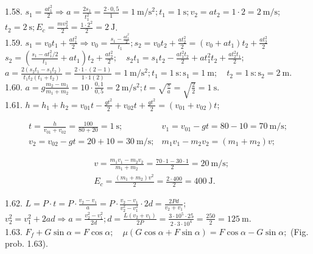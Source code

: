\documentclass[10pt]{article}
\begin{document}
1.58. $s_{1}=\frac{a t_{1}^{2}}{2} \Rightarrow a=\frac{2 s_{1}}{t_{1}^{2}}=\frac{2 \cdot 0,5}{1}=1 \mathrm{~m} / \mathrm{s}^{2} ; t_{1}=1 \mathrm{~s} ; v_{2}=a t_{2}=1 \cdot 2=2 \mathrm{~m} / \mathrm{s}$; $t_{2}=2 \mathrm{~s} ; E_{c}=\frac{m v_{2}^{2}}{2}=\frac{1 \cdot 2^{2}}{2}=2 \mathrm{~J}$.\\
1.59. $s_{1}=v_{0} t_{1}+\frac{a t_{1}^{2}}{2} \Rightarrow v_{0}=\frac{s_{1}-\frac{a t_{1}^{2}}{2}}{t_{1}} ; s_{2}=v_{0} t_{2}+\frac{a t_{2}^{2}}{2}=\left(v_{0}+a t_{1}\right) t_{2}+\frac{a t_{2}^{2}}{2}$ $s_{2}=\left(\frac{s_{1}-a t_{1}^{2} / 2}{t_{1}}+a t_{1}\right) t_{2}+\frac{a t_{2}^{2}}{2} ; \quad s_{2} t_{1}=s_{1} t_{2}-\frac{a t_{1}^{2} t_{2}}{2}+a t_{1}^{2} t_{2}+\frac{a t_{2}^{2} t_{1}}{2} ;$\\
$a=\frac{2\left(s_{2} t_{1}-s_{1} t_{2}\right)}{t_{1} t_{2}\left(t_{1}+t_{2}\right)}=\frac{2 \cdot 1 \cdot(2-1)}{1 \cdot 1(2)}=1 \mathrm{~m} / \mathrm{s}^{2} ; t_{1}=1 \mathrm{~s}: \mathrm{s}_{1}=1 \mathrm{~m} ; \quad t_{2}=1 \mathrm{~s}: \mathrm{s}_{2}=2 \mathrm{~m}$.\\
1.60. $a=g \frac{m_{2}-m_{1}}{m_{1}+m_{2}}=10 \cdot \frac{0,1}{0,5}=2 \mathrm{~m} / \mathrm{s}^{2} ; t=\sqrt{\frac{s}{a}}=\sqrt{\frac{2}{2}}=1 \mathrm{~s}$.\\
1.61. $h=h_{1}+h_{2}=v_{01} t-\frac{g t^{2}}{2}+v_{02} t+\frac{g t^{2}}{2}=\left(v_{01}+v_{02}\right) t$;

$$
\begin{array}{ll}
t=\frac{h}{v_{01}+v_{02}}=\frac{100}{80+20}=1 \mathrm{~s} ; & v_{1}=v_{01}-g t=80-10=70 \mathrm{~m} / \mathrm{s} ; \\
v_{2}=v_{02}-g t=20+10=30 \mathrm{~m} / \mathrm{s} ; & m_{1} v_{1}-m_{2} v_{2}=\left(m_{1}+m_{2}\right) v ;
\end{array}
$$

$$
\begin{aligned}
& v=\frac{m_{1} v_{1}-m_{2} v_{2}}{m_{1}+m_{2}}=\frac{70 \cdot 1-30 \cdot 1}{2}=20 \mathrm{~m} / \mathrm{s} ; \\
& E_{c}=\frac{\left(m_{1}+m_{2}\right) v^{2}}{2}=\frac{2 \cdot 400}{2}=400 \mathrm{~J} .
\end{aligned}
$$

1.62. $L=P \cdot t=P \cdot \frac{v_{2}-v_{1}}{a}=P \cdot \frac{v_{2}-v_{1}}{v_{2}^{2}-v_{1}^{2}} \cdot 2 d=\frac{2 P d}{v_{2}+v_{1}}$;\\
$v_{2}^{2}=v_{1}^{2}+2 a d \Rightarrow a=\frac{v_{2}^{2}-v_{1}^{2}}{2 d} ; d=\frac{L\left(v_{2}+v_{1}\right)}{2 P}=\frac{3 \cdot 10^{5} \cdot 25}{2 \cdot 3 \cdot 10^{4}}=\frac{250}{2}=125 \mathrm{~m}$.\\
1.63. $F_{f}+G \sin \alpha=F \cos \alpha ; \quad \mu(G \cos \alpha+F \sin \alpha)=F \cos \alpha-G \sin \alpha ;$ (Fig. prob. 1.63).
\end{document}
